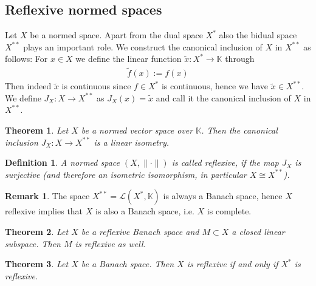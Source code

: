 \documentclass[11pt,a4paper]{article}
\newtheorem{thm}{Theorem}[section]
\newtheorem{defn}{Definition}[section]
\theoremstyle{definition}
\newtheorem{rem}{Remark}[section]
\begin{document}
\subsection{Reflexive normed spaces}
Let $X$ be a normed space. Apart from the dual space $X^*$ also the bidual space $X^{**}$ plays an important role. We construct the canonical inclusion of $X$ in $X^{**}$ as follows: For $x \in X$ we define the linear function $\tilde{x}:X^* \to \mathbb{K}$ through 
\begin{align*}
\tilde{f}(x):=f(x)
\end{align*}
Then indeed $\tilde{x}$ is continuous since $f \in X^*$ is continuous, hence we have $\tilde{x} \in X^{**}$. We define $J_X: X \to X^{**}$ as $J_X(x)= \tilde{x}$ and call it the canonical inclusion of $X$ in $X^{**}$. 
\begin{thm} Let $X$ be a normed vector space over $\mathbb{K}$. Then the canonical inclusion $J_X:X \to X^{**}$ is a linear isometry. 
\end{thm} 
\begin{defn} A normed space $(X, \| \cdot \|)$ is called reflexive, if the map $J_X$ is surjective (and therefore an isometric isomorphism, in particular $X \cong X^{**}$).
\end{defn}
\begin{rem} The space $X^{**}= \mathcal{L}(X^*, \mathbb{K})$ is always a Banach space, hence $X$ reflexive implies that $X$ is also a Banach space, i.e. $X$ is complete. 
\end{rem}
\begin{thm} Let $X$ be a reflexive Banach space and $M \subset X$ a closed linear subspace. Then $M$ is reflexive as well. 
\end{thm}
\begin{thm} Let $X$ be a Banach space. Then $X$ is reflexive if and only if $X^*$ is reflexive. 
\end{thm}
\end{document}
